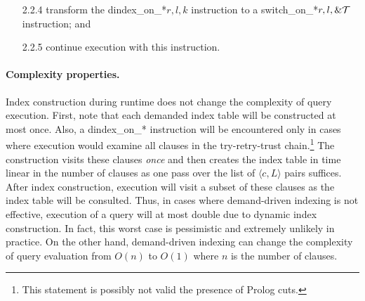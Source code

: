\documentclass{llncs}
\newcommand{\instr}[1]{\textsf{#1}}
\newcommand{\TryRetryTrust}{\mbox{\instr{try-retry-trust}}\xspace}
\newcommand{\fail}{\instr{fail}\xspace}
\newcommand{\jump}{\instr{jump}\xspace}
\newcommand{\jitiSTAR}{\mbox{\instr{dindex\_on\_*}}\xspace}
\newcommand{\switchSTAR}{\mbox{\instr{switch\_on\_*}}\xspace}
\newcommand{\JITI}{demand-driven indexing\xspace}
\begin{document}
\begin{Algorithm}[t]
\begin{enumerate}
\begin{enumerate}
\begin{itemize}
\begin{itemize}
\begin{itemize}
	    of pairs into sequences of labels ${\cal L}_c, {\cal L}_l$
	    and ${\cal L}_s$ for constants, lists and structures,
	    respectively;
	  \item for each of the four sequences ${\cal L}, {\cal L}_c,
	    {\cal L}_l, {\cal L}_s$ of labels create code as follows:
	    \begin{itemize}
	    \item the instruction \fail if the sequence is empty;
	    \item the instruction \jump $L$ if $L$ is the only label in
	      the sequence;
	    \item the sequence of instructions obtained by appending to
	      $\cal I$ a \TryRetryTrust chain for the current sequence
	      of labels;
	    \end{itemize}
	  \end{itemize}
	\end{itemize}
      \item[2.2.4] transform the \jitiSTAR $r, l, k$ instruction to
	a \switchSTAR $r, l, \&{\cal T}$ instruction; and
      \item[2.2.5] continue execution with this instruction.
      \end{itemize}
    \end{enumerate}
  \end{enumerate}
\end{Algorithm}

\paragraph*{Complexity properties.}
Index construction during runtime does not change the complexity of
query execution. First, note that each demanded index table will be
constructed at most once. Also, a \jitiSTAR instruction will be
encountered only in cases where execution would examine all clauses in
the \TryRetryTrust chain.\footnote{This statement is possibly not
valid the presence of Prolog cuts.} The construction visits these
clauses \emph{once} and then creates the index table in time linear in
the number of clauses as one pass over the list of $\langle c, L
\rangle$ pairs suffices. After index construction, execution will
visit a subset of these clauses as the index table will be consulted.
Thus, in cases where \JITI is not effective, execution of a query will
at most double due to dynamic index construction. In fact, this worst
case is pessimistic and extremely unlikely in practice. On the other
hand, \JITI can change the complexity of query evaluation from $O(n)$
to $O(1)$ where $n$ is the number of clauses.
\end{document}
